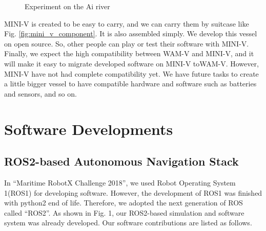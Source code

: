 \documentclass[lettersize,journal]{IEEEtran}
\begin{document}
\begin{figure}[t]
    \begin{center}
    \end{center}
    \caption{Experiment on the Ai river}
    \label{fig:mini_v_experiment}
  \end{figure}

MINI-V is created to be easy to carry, and we can carry them by suitcase like Fig. \ref{fig:mini_v_component}.
It is also assembled simply. We develop this vessel on open source. So, other people can play or test their software with MINI-V. Finally,
we expect the high compatibility between WAM-V and MINI-V, and it will make it easy to migrate developed software on MINI-V toWAM-V. However, 
MINI-V have not had complete compatibility yet.
We have future tasks to create a little bigger vessel to have compatible hardware and software such as batteries and sensors, and so on.

\section{Software Developments}
\subsection{ROS2-based Autonomous Navigation Stack}
In “Maritime RobotX Challenge 2018”, we used Robot Operating System 1(ROS1) for developing software.
However, the development of ROS1 was finished with python2 end of life.
Therefore, we adopted the next generation of ROS called “ROS2”. \cite{ROS2_paper}
As shown in Fig. 1, our ROS2-based simulation and software system was already developed.
Our software contributions are listed as follows.
\end{document}
